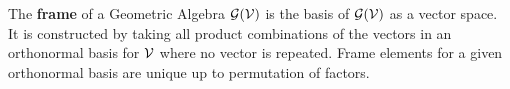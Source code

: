 \begin{definition}[Frame]
	The \textbf{frame} of a Geometric Algebra $\mathcal{G}(\mathcal{V})$ is the basis of $\mathcal{G}(\mathcal{V})$ as a vector space. It is constructed by taking all product combinations of the vectors in an orthonormal basis for $\mathcal{V}$ where no vector is repeated. Frame elements for a given orthonormal basis are unique up to permutation of factors.
\end{definition}

